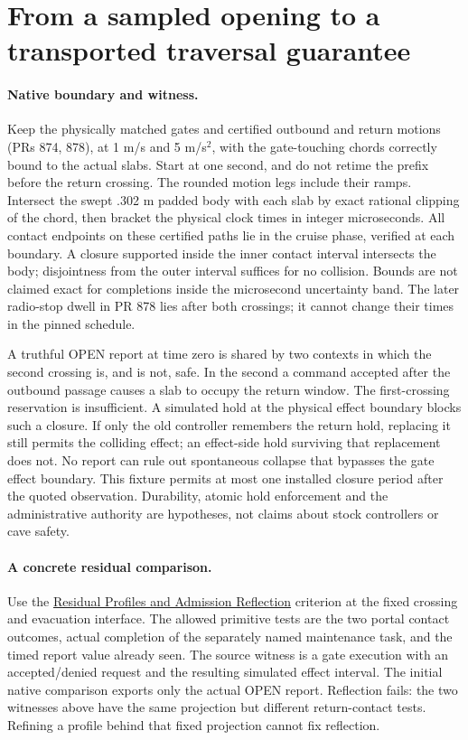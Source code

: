 \documentclass{article}
\begin{document}
\section*{From a sampled opening to a transported traversal guarantee}
\paragraph{Native boundary and witness.}
Keep the physically matched gates and certified outbound and return
motions (PRs 874, 878), at 1 m/s and 5 m/s$^2$, with the gate-touching
chords correctly bound to the actual slabs. Start at one second, and
do not retime the prefix before the return crossing. The rounded
motion legs include their ramps. Intersect the swept .302 m padded
body with each slab by exact rational clipping of the chord, then
bracket the physical clock times in integer microseconds. All contact
endpoints on these certified paths lie in the cruise phase, verified
at each boundary. A closure supported inside the inner contact
interval intersects the body; disjointness from the outer interval
suffices for no collision. Bounds are not claimed exact for completions
inside the microsecond uncertainty band. The later radio-stop dwell
in PR 878 lies after both crossings; it cannot change their times in
the pinned schedule.

A truthful OPEN report at time zero is shared by two contexts in
which the second crossing is, and is not, safe. In the second
a command accepted after the outbound passage causes a slab to occupy
the return window. The first-crossing reservation is insufficient.
A simulated hold at the physical effect boundary blocks such a closure.
If only the old controller remembers the return hold, replacing it
still permits the colliding effect; an effect-side hold surviving that
replacement does not. No report can rule out spontaneous collapse
that bypasses the gate effect boundary. This fixture permits at most
one installed closure period after the quoted observation. Durability,
atomic hold enforcement and the administrative authority are
hypotheses, not claims about stock controllers or cave safety.

\paragraph{A concrete residual comparison.}
Use the \href{https://github.com/eternal-november/eos-research-programmes/blob/4359a8a1484498b9c46d8e58a0112448a1fba06b/projects/contextual-composition/feedback-and-concurrency/observable-covers/Residual_Profiles_and_Admission_Reflection.tex}
{Residual Profiles and Admission Reflection} criterion at the
fixed crossing and evacuation interface. The allowed primitive
tests are the two portal contact outcomes, actual completion of the
separately named maintenance task, and the timed report value already
seen. The source witness is a gate execution with an accepted/denied
request and the resulting simulated effect interval. The initial
native comparison exports only the actual OPEN report. Reflection
fails: the two witnesses above have the same projection but different
return-contact tests. Refining a profile behind that fixed projection
cannot fix reflection.
\end{document}
